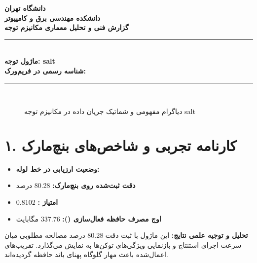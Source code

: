 \documentclass[12pt,a4paper]{article}
\begin{document}
\begin{center}
{\Large\bfseries دانشگاه تهران}\\[0.2cm]
{\large\bfseries دانشکده مهندسی برق و کامپیوتر}\\[0.2cm]
{\large\bfseries گزارش فنی و تحلیل معماری مکانیزم توجه}\\[0.5cm]
\rule{\linewidth}{1pt}\\[0.3cm]
{\LARGE\bfseries ماژول توجه: salt}\\[0.2cm]
{\large \textbf{شناسه رسمی در فریم‌ورک:} }\\[0.2cm]
\rule{\linewidth}{1pt}\\[0.5cm]
\end{center}

\begin{figure}[H]
\centering
{}
\caption{دیاگرام مفهومی و شماتیک جریان داده در مکانیزم توجه salt}
\end{figure}

\section*{۱. کارنامه تجربی و شاخص‌های بنچ‌مارک}
\begin{itemize}
\item \textbf{وضعیت ارزیابی در خط لوله:} 
\item \textbf{دقت ثبت‌شده روی بنچ‌مارک:} 80.28 درصد
\item \textbf{امتیاز :} 0.8102
\item \textbf{اوج مصرف حافظه فعال‌سازی ():} 337.76 مگابایت
\end{itemize}
\textbf{تحلیل و توجیه علمی نتایج:} این ماژول با ثبت دقت 80.28 درصد مصالحه مطلوبی میان سرعت اجرای استنتاج و بازنمایی ویژگی‌های توکن‌ها به نمایش می‌گذارد. تقریب‌های اعمال‌شده باعث مهار گلوگاه پهنای باند حافظه گردیده‌اند.
\end{document}
